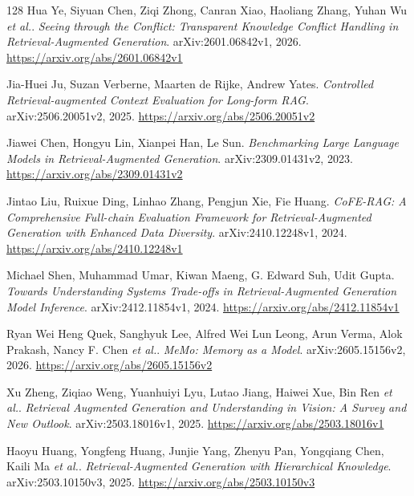 \documentclass[11pt,a4paper]{article}
\begin{document}
\begin{thebibliography}{128}
Hua Ye, Siyuan Chen, Ziqi Zhong, Canran Xiao, Haoliang Zhang, Yuhan Wu \emph{et al.}.
\newblock \emph{Seeing through the Conflict: Transparent Knowledge Conflict Handling in Retrieval-Augmented Generation}.
\newblock arXiv:2601.06842v1, 2026.
\newblock \url{https://arxiv.org/abs/2601.06842v1}

Jia-Huei Ju, Suzan Verberne, Maarten de Rijke, Andrew Yates.
\newblock \emph{Controlled Retrieval-augmented Context Evaluation for Long-form RAG}.
\newblock arXiv:2506.20051v2, 2025.
\newblock \url{https://arxiv.org/abs/2506.20051v2}

Jiawei Chen, Hongyu Lin, Xianpei Han, Le Sun.
\newblock \emph{Benchmarking Large Language Models in Retrieval-Augmented Generation}.
\newblock arXiv:2309.01431v2, 2023.
\newblock \url{https://arxiv.org/abs/2309.01431v2}

Jintao Liu, Ruixue Ding, Linhao Zhang, Pengjun Xie, Fie Huang.
\newblock \emph{CoFE-RAG: A Comprehensive Full-chain Evaluation Framework for Retrieval-Augmented Generation with Enhanced Data Diversity}.
\newblock arXiv:2410.12248v1, 2024.
\newblock \url{https://arxiv.org/abs/2410.12248v1}

Michael Shen, Muhammad Umar, Kiwan Maeng, G. Edward Suh, Udit Gupta.
\newblock \emph{Towards Understanding Systems Trade-offs in Retrieval-Augmented Generation Model Inference}.
\newblock arXiv:2412.11854v1, 2024.
\newblock \url{https://arxiv.org/abs/2412.11854v1}

Ryan Wei Heng Quek, Sanghyuk Lee, Alfred Wei Lun Leong, Arun Verma, Alok Prakash, Nancy F. Chen \emph{et al.}.
\newblock \emph{MeMo: Memory as a Model}.
\newblock arXiv:2605.15156v2, 2026.
\newblock \url{https://arxiv.org/abs/2605.15156v2}

Xu Zheng, Ziqiao Weng, Yuanhuiyi Lyu, Lutao Jiang, Haiwei Xue, Bin Ren \emph{et al.}.
\newblock \emph{Retrieval Augmented Generation and Understanding in Vision: A Survey and New Outlook}.
\newblock arXiv:2503.18016v1, 2025.
\newblock \url{https://arxiv.org/abs/2503.18016v1}

Haoyu Huang, Yongfeng Huang, Junjie Yang, Zhenyu Pan, Yongqiang Chen, Kaili Ma \emph{et al.}.
\newblock \emph{Retrieval-Augmented Generation with Hierarchical Knowledge}.
\newblock arXiv:2503.10150v3, 2025.
\newblock \url{https://arxiv.org/abs/2503.10150v3}


\end{thebibliography}
\end{document}
